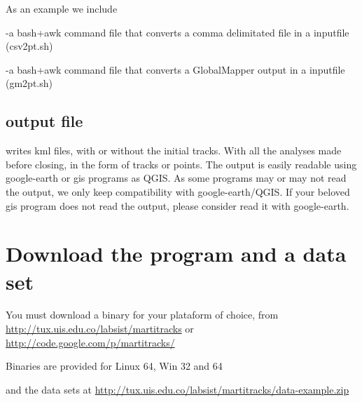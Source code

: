 As an example we include 

		-a bash+awk command file that converts a comma delimitated file in a \mt inputfile (csv2pt.sh)

		-a bash+awk command file that converts a GlobalMapper output in a \mt inputfile (gm2pt.sh)


\vspace{-7\baselineskip}
\vspace{7\baselineskip}
		 
	 

\vspace{-7\baselineskip}
\vspace{7\baselineskip}
	
	
\subsection*{\mt output file}

\MT writes kml files, with or without the initial tracks. With all the analyses made before closing, in the form of tracks or points. The output is easily readable using google-earth or gis programs as QGIS. As some programs may or may not read the output, we only keep compatibility with google-earth/QGIS. If your beloved gis program does not read the output, please consider read it with google-earth.




\section{Download the program and a data set}
\label{download}

You must download a binary for your plataform of choice, from  \url{http://tux.uis.edu.co/labsist/martitracks} or \url{http://code.google.com/p/martitracks/}


Binaries are provided for Linux 64, Win 32 and 64


and the data sets at \url{http://tux.uis.edu.co/labsist/martitracks/data-example.zip}


